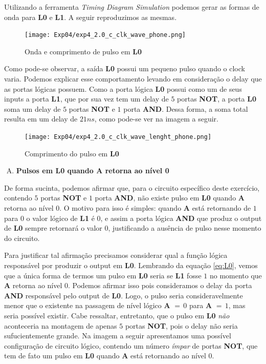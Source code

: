 \documentclass[12pt]{article}
\begin{document}
Utilizando a ferramenta \emph{Timing Diagram Simulation} podemos gerar as
formas de onda para \textbf{L0} e \textbf{L1}. A seguir reproduzimos as mesmas.

\begin{figure}[H]
    \centering
    \texttt{[image: Exp04/exp4\_2.0\_c\_clk\_wave\_phone.png]}
    \caption{Onda e comprimento de pulso em \textbf{L0}}\label{fig:exp4_2.0_c_clk_wave_phone.png}
\end{figure}

Como pode-se observar, a saída \textbf{L0} possui um pequeno pulso quando o
clock varia. Podemos explicar esse comportamento levando em consideração o delay
que as portas lógicas possuem. Como a porta lógica \textbf{L0} possui como um de
seus inputs a porta \textbf{L1}, que por sua vez tem um delay de $5$ portas
\textbf{NOT}, a porta \textbf{L0} soma um delay de $5$ portas \textbf{NOT} e $1$
porta \textbf{AND}. Dessa forma, a soma total resulta em um delay de $21ns$,
como pode-se ver na imagem a seguir.

\begin{figure}[H]
    \centering
    \texttt{[image: Exp04/exp4\_2.0\_c\_clk\_wave\_lenght\_phone.png]}
    \caption{Comprimento do pulso em \textbf{L0}}\label{fig:exp4_2.0_c_clk_wave_lenght_phone.png}
\end{figure}

\begin{enumerate}[D)]
\item \textbf{Pulsos em L0 quando A retorna ao nível 0}
\end{enumerate}

De forma sucinta, podemos afirmar que, para o circuito específico deste
exercício, contendo $5$ portas \textbf{NOT} e $1$ porta \textbf{AND}, não existe
pulso em \textbf{L0} quando \textbf{A} retorna ao nível $0$. O motivo para isso
é simples: quando \textbf{A} está retornando de $1$ para $0$ o valor lógico de
\textbf{L1} é $0$, e assim a porta lógica \textbf{AND} que produz o output de
\textbf{L0} sempre retornará o valor $0$, justificando a ausência de pulso nesse
momento do circuito.

Para justificar tal afirmação precisamos considerar qual a função lógica
responsável por produzir o output em \textbf{L0}. Lembrando da equação
\ref{eq:L0}, vemos que a única forma de termos um pulso em \textbf{L0} seria se
\textbf{L1} fosse $1$ no momento que \textbf{A} retorna ao nível $0$. Podemos
afirmar isso pois consideramos o delay da porta \textbf{AND} responsável pelo
output de \textbf{L0}. Logo, o pulso seria consideravelmente menor que o
existente na passagem de nível lógico \textbf{A} $= \, 0$ para \textbf{A}
$= \, 1$, mas seria possível existir. Cabe ressaltar, entretanto, que o pulso em
\textbf{L0} \emph{não} aconteceria na montagem de apenas $5$ portas
\textbf{NOT}, pois o delay não seria sufucientemente grande. Na imagem a seguir
apresentamos uma possível configuração de circuito lógico, contendo um número
\emph{ímpar} de portas \textbf{NOT}, que tem de fato um pulso em \textbf{L0}
quando \textbf{A} está retornando ao nível $0$.
\end{document}
